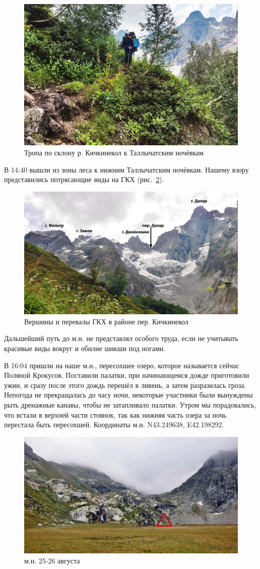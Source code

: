 \begin{figure}[h!]
	\centering
	\includegraphics[width=0.7\linewidth]{../pics/IMG_20240825_134744.jpg}
	\caption{Тропа по склону р. Кичкинекол к Таллычатским ночёвкам}
	\label{fig:IMG_20240825_134744.jpg}
\end{figure}


В 14:40 вышли из зоны леса к нижним Таллычатским ночёвкам. Нашему взору представились потрясающие виды на ГКХ (рис.~\ref{fig:DSC_0158.JPG}). 

\begin{figure}[h!]
	\centering
	\includegraphics[width=0.7\linewidth]{../pics/DSC_0158.jpg}
	\caption{Вершины и перевалы ГКХ в районе пер. Кичкинекол}
	\label{fig:DSC_0158.JPG}
\end{figure}

Дальшейший путь до м.н. не представлял особого труда, если не учитывать красивые виды вокруг и обилие шикши под ногами.

В 16:04 пришли на наше м.н., пересохшее озеро, которое называется сейчас Поляной Крокусов. Поставили  палатки, при начинающемся дожде приготовили ужин, и сразу после этого дождь перешёл в ливень, а затем разразилась гроза. Непогода не прекращалась до часу ночи, некоторые участники были вынуждены рыть дренажные канавы, чтобы не затапливало палатки. Утром мы порадовались, что встали в верхней части стоянок, так как нижняя часть озера за ночь перестала быть пересохшей.
Координаты м.н. N43.249638\degree, E42.198292\degree.

\begin{figure}[h!]
	\centering
	\includegraphics[width=0.7\linewidth]{../pics/DSC_0177.jpg}
	\caption{м.н. 25-26 августа}
	\label{fig:DSC_0177.JPG}
\end{figure}


\clearpage